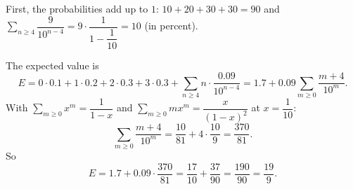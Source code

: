 First, the probabilities add up to $1$: $10+20+30+30=90$ and $\displaystyle\sum_{n\ge4}\dfrac{9}{10^{n-4}}=9\cdot\dfrac{1}{1-\dfrac1{10}}=10$ (in percent).

The expected value is
\[E=0\cdot0.1+1\cdot0.2+2\cdot0.3+3\cdot0.3+\sum_{n\ge4}n\cdot\dfrac{0.09}{10^{n-4}}=1.7+0.09\sum_{m\ge0}\dfrac{m+4}{10^m}.\]
With $\displaystyle\sum_{m\ge0}x^m=\dfrac1{1-x}$ and $\displaystyle\sum_{m\ge0}mx^m=\dfrac{x}{(1-x)^2}$ at $x=\dfrac1{10}$:
\[\sum_{m\ge0}\dfrac{m+4}{10^m}=\dfrac{10}{81}+4\cdot\dfrac{10}{9}=\dfrac{370}{81}.\]
So
\[E=1.7+0.09\cdot\dfrac{370}{81}=\dfrac{17}{10}+\dfrac{37}{90}=\dfrac{190}{90}=\boxed{\dfrac{19}{9}}.\]
